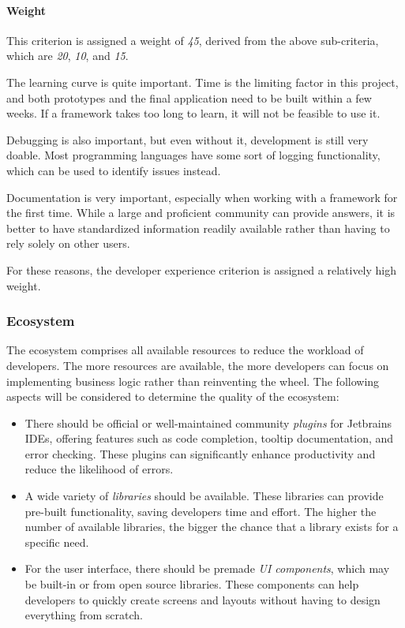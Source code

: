 \paragraph{Weight}
This criterion is assigned a weight of \emph{45}, derived from the above sub-criteria, which are \emph{20}, \emph{10}, and \emph{15}.

The learning curve is quite important.
Time is the limiting factor in this project, and both prototypes and the final application need to be built within a few weeks.
If a framework takes too long to learn, it will not be feasible to use it.

Debugging is also important, but even without it, development is still very doable.
Most programming languages have some sort of logging functionality, which can be used to identify issues instead.

Documentation is very important, especially when working with a framework for the first time.
While a large and proficient community can provide answers, it is better to have standardized information readily available rather than having to rely solely on other users.

For these reasons, the developer experience criterion is assigned a relatively high weight.

\subsubsection{Ecosystem}\label{subsubsec:ecosystem}
The ecosystem comprises all available resources to reduce the workload of developers.
The more resources are available, the more developers can focus on implementing business logic rather than reinventing the wheel.
The following aspects will be considered to determine the quality of the ecosystem:

\begin{itemize}
	\item There should be official or well-maintained community \emph{plugins} for Jetbrains IDEs, offering features such as code completion, tooltip documentation, and error checking.
	      These plugins can significantly enhance productivity and reduce the likelihood of errors.
	\item A wide variety of \emph{libraries} should be available.
	      These libraries can provide pre-built functionality, saving developers time and effort.
	      The higher the number of available libraries, the bigger the chance that a library exists for a specific need.
	\item For the user interface, there should be premade \emph{UI components}, which may be built-in or from open source libraries.
	      These components can help developers to quickly create screens and layouts without having to design everything from scratch.
\end{itemize}

